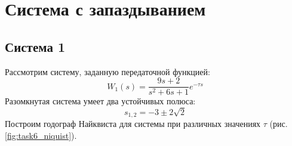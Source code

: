 \section{Система с запаздыванием}
\subsection{Система 1}
Рассмотрим систему, заданную передаточной функцией: 
\begin{equation}
    W_1(s) = \frac{9s + 2}{s^2 + 6s + 1}e^{-\tau s}
\end{equation}
Разомкнутая система умеет два устойчивых полюса: 
\begin{equation}
    s_{1,2} = -3 \pm 2\sqrt{2}
\end{equation}
Построим годограф Найквиста для системы при различных значениях $\tau$ (рис. \ref{fig:task6_niquist}).
